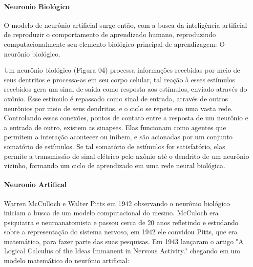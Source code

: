 \documentclass[	12pt, Times, openright, twoside, a4paper, english, brazil]{abntex2}
\begin{document}
          \paragraph*{Neuronio Biológico}
            O modelo de neurônio artificial surge então, com a busca da inteligência artificial de reproduzir o comportamento de aprendizado humano, reproduzindo computacionalmente seu elemento biológico principal de aprendizagem: O neurônio biológico. 
            \begin{figure}[H]
            \end{figure}
            Um neurônio biológico (Figura 04) processa informações recebidas por meio de seus dentritos e processa-as em seu corpo celular, tal reação à esses estímulos recebidos gera um sinal de saída como resposta aos estímulos, enviado através do axônio. Esse estímulo é repassado como sinal de entrada, através de outros neurônios por meio de seus dendritos, e o ciclo se repete em uma vasta rede.
            Controlando essas conexões, pontos de contato entre a resposta de um neurônio e a entrada de outro, existem as sinapses. Elas funcionam como agentes que permitem a interação acontecer ou inibem, e são acionadas por um conjunto somatório de estímulos. Se tal somatório de estímulos for satisfatório, elas permite a transmissão de sinal elétrico pelo axônio até o dendrito de um neurônio vizinho, formando um ciclo de aprendizado em uma rede neural biológica.

          \paragraph*{Neuronio Artifical}
            Warren McCulloch e Walter Pitts em 1942 observando o neurônio biológico iniciam a busca de um modelo computacional do mesmo. McCuloch era psiquiatra e neuroanatomista e passou cerca de 20 anos refletindo e estudando sobre a representação do sistema nervoso, em 1942 ele convidou Pitts, que era matemático, para fazer parte das suas pesquisas. Em 1943 lançaram o artigo "A Logical Calculus of the Ideas Immanent in Nervous Activity." chegando em um modelo matemático do neurônio artificial: 
\end{document}

